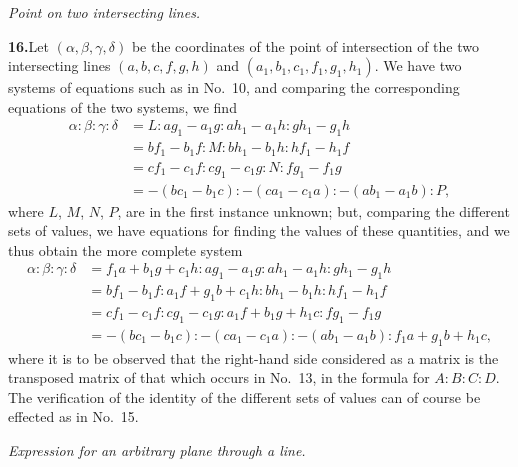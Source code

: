 \documentclass[11pt,a4paper]{article}
\begin{document}
\medskip
\noindent\textit{Point on two intersecting lines.}
\medskip

\textbf{16.}\quad Let $(\alpha, \beta, \gamma, \delta)$ be the coordinates of
the point of intersection of the two intersecting lines $(a, b, c, f, g, h)$
and $(a_{1}, b_{1}, c_{1}, f_{1}, g_{1}, h_{1})$. We have two systems of
equations such as in No.~10, and comparing the corresponding equations of the
two systems, we find
\begin{align*}
\alpha : \beta : \gamma : \delta &= L : a g_{1} - a_{1} g : a h_{1} - a_{1} h : g h_{1} - g_{1} h \\
   &= b f_{1} - b_{1} f : M : b h_{1} - b_{1} h : h f_{1} - h_{1} f \\
   &= c f_{1} - c_{1} f : c g_{1} - c_{1} g : N : f g_{1} - f_{1} g \\
   &= -(b c_{1} - b_{1} c) : -(c a_{1} - c_{1} a) : -(a b_{1} - a_{1} b) : P,
\end{align*}
where $L$, $M$, $N$, $P$, are in the first instance unknown; but, comparing
the different sets of values, we have equations for finding the values of
these quantities, and we thus obtain the more complete system
\begin{align*}
\alpha : \beta : \gamma : \delta
   &= f_{1} a + b_{1} g + c_{1} h : a g_{1} - a_{1} g : a h_{1} - a_{1} h : g h_{1} - g_{1} h \\
   &= b f_{1} - b_{1} f : a_{1} f + g_{1} b + c_{1} h : b h_{1} - b_{1} h : h f_{1} - h_{1} f \\
   &= c f_{1} - c_{1} f : c g_{1} - c_{1} g : a_{1} f + b_{1} g + h_{1} c : f g_{1} - f_{1} g \\
   &= -(b c_{1} - b_{1} c) : -(c a_{1} - c_{1} a) : -(a b_{1} - a_{1} b) : f_{1} a + g_{1} b + h_{1} c,
\end{align*}
where it is to be observed that the right-hand side considered as a matrix is
the transposed matrix of that which occurs in No.~13, in the formula for
$A : B : C : D$. The verification of the identity of the different sets of
values can of course be effected as in No.~15.

\medskip
\noindent\textit{Expression for an arbitrary plane through a line.}
\medskip
\end{document}
